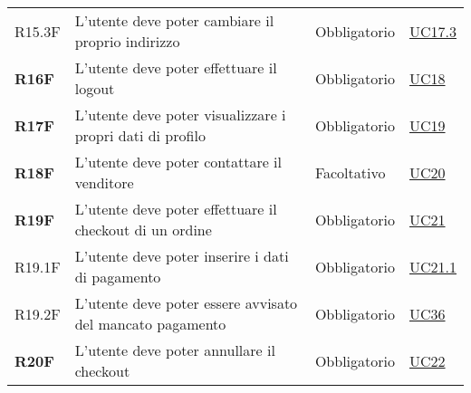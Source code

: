 \begin{center}
\begin{longtable}[!h]{p{50px} p{245px} p{75px} p{50px}}
        R15.3F                                & L'utente deve poter cambiare il proprio indirizzo                                                   & Obbligatorio             & \hyperref[sec:UC17.3]{UC17.3}                  \\
        \textbf{R16F}                         & L'utente deve poter effettuare il logout                                                            & Obbligatorio             & \hyperref[sec:UC18]{UC18}                      \\
        \textbf{R17F}                         & L'utente deve poter visualizzare i propri dati di profilo                                           & Obbligatorio             & \hyperref[sec:UC19]{UC19}                      \\
        \textbf{R18F}                         & L'utente deve poter contattare il venditore                                                         & Facoltativo              & \hyperref[sec:UC20]{UC20}                      \\
        \textbf{R19F}                         & L'utente deve poter effettuare il checkout di un ordine                                             & Obbligatorio             & \hyperref[sec:UC21]{UC21}                      \\
        R19.1F                                & L'utente deve poter inserire i dati di pagamento                                                    & Obbligatorio             & \hyperref[sec:UC21.1]{UC21.1}                  \\
        R19.2F                                & L'utente deve poter essere avvisato del mancato pagamento                                           & Obbligatorio             & \hyperref[sec:UC36]{UC36}                      \\
        \textbf{R20F}                         & L'utente deve poter annullare il checkout                                                           & Obbligatorio             & \hyperref[sec:UC22]{UC22}                      \\

\end{longtable}
\end{center}
